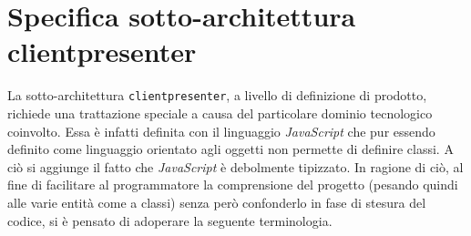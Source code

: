 \clearpage

\section{Specifica sotto-architettura clientpresenter}\label{sec:clientpresenterarchitecture}

La sotto-architettura \texttt{clientpresenter}, a livello di definizione di prodotto, richiede una trattazione speciale a causa del particolare dominio tecnologico coinvolto. Essa è infatti definita con il linguaggio \textit{JavaScript} che pur essendo definito come linguaggio orientato agli oggetti non permette di definire classi. A ciò si aggiunge il fatto che \textit{JavaScript} è debolmente tipizzato.
 In ragione di ciò, al fine di facilitare al programmatore la comprensione del progetto (pesando quindi alle varie entità come a classi) senza però confonderlo in fase di stesura del codice, si è pensato di adoperare la seguente terminologia.

